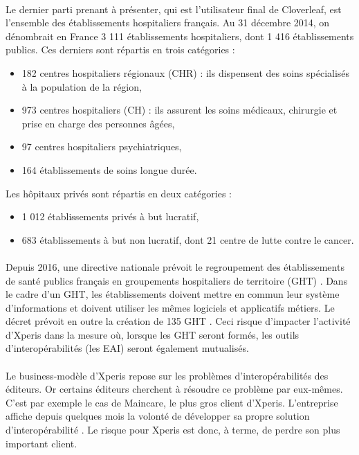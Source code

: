 			\paragraph{}%
			Le dernier parti prenant à présenter, qui est l'utilisateur final de
			Cloverleaf, est l'ensemble des établissements hospitaliers français. Au 31
			décembre 2014, on dénombrait en France 3 111 établissements hospitaliers,
			dont 1 416 établissements publics. Ces derniers sont répartis en trois
			catégories \citep{drees_panoramas_2016} :
			\begin{itemize}
				\item 182 centres hospitaliers régionaux (CHR) : ils dispensent des soins 
				spécialisés à la population de la région,
				\item 973 centres hospitaliers (CH) : ils assurent les soins médicaux, 
				chirurgie et prise en charge des personnes âgées,
				\item 97 centres hospitaliers psychiatriques,
				\item 164 établissements de soins longue durée.
			\end{itemize}
			Les hôpitaux privés sont répartis en deux catégories :
			\begin{itemize}
				\item 1 012 établissements privés à but lucratif,
				\item 683 établissements à but non lucratif, dont 21 centre de lutte contre 
				le cancer.
			\end{itemize}
			
			\paragraph{}%
			Depuis 2016, une directive nationale prévoit le regroupement des établissements de 
			santé publics français en groupements hospitaliers de territoire (GHT) 
			\citep{valls_decret_2016}. Dans le cadre d'un GHT, les établissements doivent mettre 
			en commun leur système d'informations et doivent utiliser les mêmes logiciels et 
			applicatifs métiers. Le décret prévoit en outre la création de 135 GHT  
			\citep{touraine_marisol_2016}. Ceci risque d'impacter l'activité d'Xperis dans la 
			mesure où, lorsque les GHT seront formés, les outils d'interopérabilités 
			(les EAI) seront également mutualisés.
			
			\paragraph{}%
			Le business-modèle d'Xperis repose sur les problèmes d'interopérabilités des 
			éditeurs. Or certains éditeurs cherchent à résoudre ce problème par
			eux-mêmes. C'est par exemple le cas de Maincare, le plus gros client
			d'Xperis. L'entreprise affiche depuis quelques mois la volonté de développer
			sa propre solution d'interopérabilité \citep{perochon_e-sante:_2016}. Le
			risque pour Xperis est donc, à terme, de perdre son plus important client. 
			
